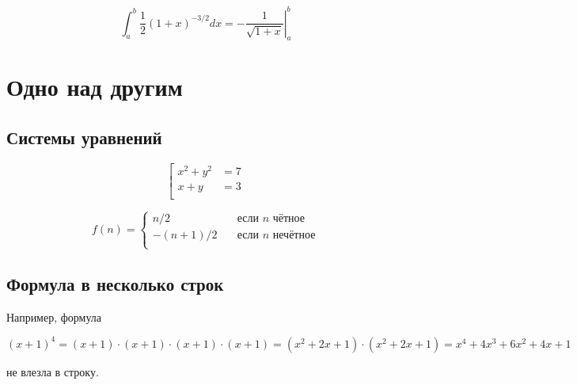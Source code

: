 \documentclass[12pt, a4paper]{article}
\begin{document}
\[ \int_a^b \frac{1}{2} (1+x)^{-3/2} dx = \left. -\frac{1}{\sqrt{1+x}} \right|_a^b \]





\section{Одно над другим}

\subsection{Системы уравнений}

\[
	\left[
	\begin{aligned}
		x^2+y^2&=7\\
		x+y & = 3 \\
	\end{aligned}
	\right.
\]

\[ f(n) =
  \begin{cases}
    n/2       & \quad \text{если } n \text{ чётное}\\
    -(n+1)/2  & \quad \text{если } n \text{ нечётное}\\
  \end{cases}
\]





\subsection{Формула в несколько строк}


Например, формула 

 \[(x+1)^4 = (x+1) \cdot (x+1) \cdot (x+1) \cdot (x+1) = (x^2 + 2x + 1) \cdot (x^2 + 2x + 1) = x^4 + 4x^3 + 6x^2 + 4x+ 1 \]
 
не влезла в строку.
\end{document}
